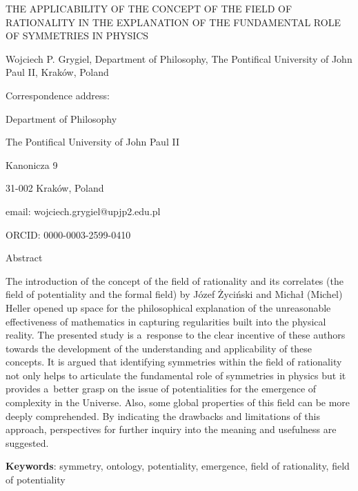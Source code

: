 \setcounter{secnumdepth}{0}







THE APPLICABILITY OF THE CONCEPT OF THE FIELD OF RATIONALITY IN THE EXPLANATION OF THE FUNDAMENTAL ROLE OF SYMMETRIES IN PHYSICS



Wojciech P. Grygiel, Department of Philosophy, The Pontifical University of John Paul II, Kraków, Poland



Correspondence address:



Department of Philosophy



The Pontifical University of John Paul II



Kanonicza 9



31-002 Kraków, Poland



email: wojciech.grygiel@upjp2.edu.pl



ORCID: 0000-0003-2599-0410



Abstract



The introduction of the concept of the field of rationality and its correlates (the field of potentiality and the formal field) by Józef Życiński and Michał (Michel) Heller opened up space for the philosophical explanation of the unreasonable effectiveness of mathematics in capturing regularities built into the physical reality. The presented study is a~response to the clear incentive of these authors towards the development of the understanding and applicability of these concepts. It is argued that identifying symmetries within the field of rationality not only helps to articulate the fundamental role of symmetries in physics but it provides a~better grasp on the issue of potentialities for the emergence of complexity in the Universe. Also, some global properties of this field can be more deeply comprehended. By indicating the drawbacks and limitations of this approach, perspectives for further inquiry into the meaning and usefulness are suggested.



\textbf{Keywords}: symmetry, ontology, potentiality, emergence, field of rationality, field of potentiality



